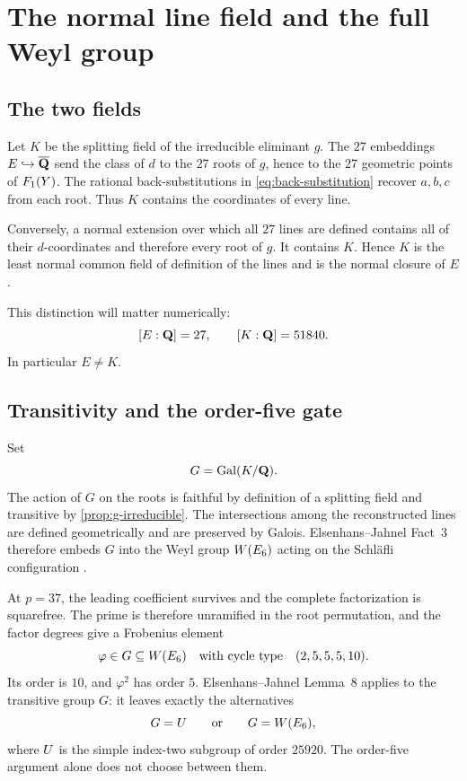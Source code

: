 \section{The normal line field and the full Weyl group}
\label{sec:weyl-galois}

\subsection{The two fields}

Let \(K\) be the splitting field of the irreducible eliminant \(g\).  The
\(27\) embeddings \(E\hookrightarrow\overline{\mathbf Q}\) send the class of \(d\) to the
\(27\) roots of \(g\), hence to the \(27\) geometric points of
\(F_1(Y)\).  The rational back-substitutions in
\cref{eq:back-substitution} recover \(a,b,c\) from each root.  Thus \(K\)
contains the coordinates of every line.

Conversely, a normal extension over which all \(27\) lines are defined
contains all of their \(d\)-coordinates and therefore every root of \(g\).
It contains \(K\).  Hence \(K\) is the least normal common field of
definition of the lines and is the normal closure of \(E\).

This distinction will matter numerically:
\[
 [E:\mathbf Q]=27,\qquad [K:\mathbf Q]=51840.
\]
In particular \(E\ne K\).

\subsection{Transitivity and the order-five gate}

Set
\[
 G=\operatorname{Gal}(K/\mathbf Q).
\]
The action of \(G\) on the roots is faithful by definition of a splitting
field and transitive by \cref{prop:g-irreducible}.  The intersections among
the reconstructed lines are defined geometrically and are preserved by
Galois.  Elsenhans--Jahnel Fact~3 therefore embeds \(G\) into the Weyl group
\(W(E_6)\) acting on the Schläfli configuration
\cite{ElsenhansJahnel2009}.

At \(p=37\), the leading coefficient survives and the complete factorization
is squarefree.  The prime is therefore unramified in the root permutation,
and the factor degrees give a Frobenius element
\begin{equation}
 \varphi\in G\subseteq W(E_6)
 \quad\text{with cycle type}\quad(2,5,5,5,10).
\label{eq:frob-type}
\end{equation}
Its order is \(10\), and \(\varphi^2\) has order \(5\).
Elsenhans--Jahnel Lemma~8 applies to the transitive group \(G\): it leaves
exactly the alternatives
\begin{equation}
  G=U\qquad\text{or}\qquad G=W(E_6),
\label{eq:two-alternatives}
\end{equation}
where \(U\) is the simple index-two subgroup of order \(25920\).
The order-five argument alone does not choose between them.

